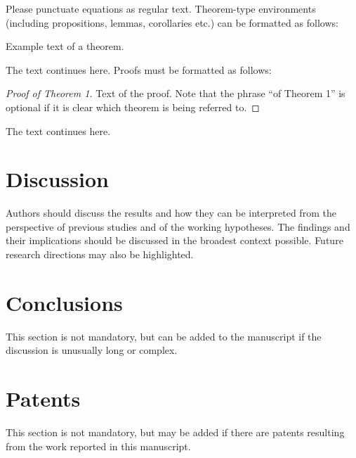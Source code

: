 \documentclass[journal,article,submit,moreauthors,pdftex]{Definitions/mdpi}
\begin{document}
\begin{paracol}{2}
    \linenumbers
    \switchcolumn
    
    Please punctuate equations as regular text. Theorem-type environments (including propositions, lemmas, corollaries etc.) can be formatted as follows:
    \begin{Theorem}
        Example text of a theorem.
    \end{Theorem}
    
    The text continues here. Proofs must be formatted as follows:
    
    \begin{proof}[Proof of Theorem 1]
        Text of the proof. Note that the phrase ``of Theorem 1'' is optional if it is clear which theorem is being referred to.
    \end{proof}
    The text continues here.
    
    \section{Discussion}
    
    Authors should discuss the results and how they can be interpreted from the perspective of previous studies and of the working hypotheses. The findings and their implications should be discussed in the broadest context possible. Future research directions may also be highlighted.
    
    \section{Conclusions}
    
    This section is not mandatory, but can be added to the manuscript if the discussion is unusually long or complex.
    
    \section{Patents}
    
    This section is not mandatory, but may be added if there are patents resulting from the work reported in this manuscript.
    
    \vspace{6pt} 
    

\end{paracol}
\end{document}
